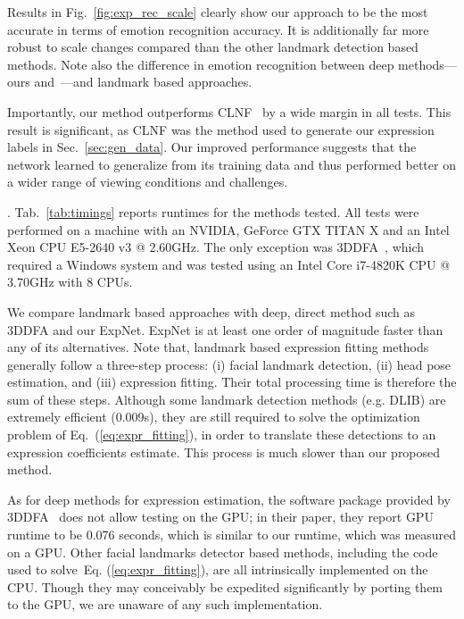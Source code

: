 \documentclass[a4paper, 10pt, conference]{ieeeconf}
\newcommand{\minisection}[1]{\vspace{2mm}\noindent{\bf #1}.}
\begin{document}
Results in Fig.~\ref{fig:exp_rec_scale} clearly show our approach to be the most accurate in terms of emotion recognition accuracy. It is additionally far more robust to scale changes compared than the other landmark detection based methods. Note also the  difference in emotion recognition between deep methods---ours and~\cite{zhu2015}---and landmark based approaches.

Importantly, our method outperforms CLNF~\cite{baltrusaitis2013constrained} by a wide margin in all tests. This result is significant, as CLNF was the method used to generate our expression labels in Sec.~\ref{sec:gen_data}. Our improved performance suggests that the network learned to generalize from its training data and thus performed better on a wider range of viewing conditions and challenges.



\minisection{Runtime} Tab.~\ref{tab:timings} reports runtimes for the methods tested. All tests were performed on a machine with an NVIDIA, GeForce GTX TITAN X and an Intel Xeon CPU E5-2640 v3 @ 2.60GHz. The only exception was 3DDFA~\cite{zhu2015}, which required a Windows system and was tested using an Intel Core i7-4820K CPU @ 3.70GHz with 8 CPUs.


We compare landmark based approaches with deep, direct method such as 3DDFA and our ExpNet. ExpNet is at least one order of magnitude faster than any of its alternatives. Note that, landmark based expression fitting methods generally follow a three-step process: (i) facial landmark detection, (ii) head pose estimation, and (iii) expression fitting. Their total processing time is therefore the sum of these steps. Although some landmark detection methods (e.g. DLIB) are extremely efficient (0.009s), they are still required to solve the optimization problem of Eq.~(\ref{eq:expr_fitting}), in order to translate these detections to an expression coefficients estimate. This process is much slower than our proposed method.


As for deep methods for expression estimation, the software package provided by 3DDFA~\cite{zhu2015} does not allow testing on the GPU; in their paper, they report GPU runtime to be 0.076 seconds, which is similar to our runtime, which was measured on a GPU. Other facial landmarks detector based methods, including the code used to solve~Eq. (\ref{eq:expr_fitting}), are all intrinsically implemented on the CPU. Though they may conceivably be expedited significantly by porting them to the GPU, we are unaware of any such implementation.
\end{document}
